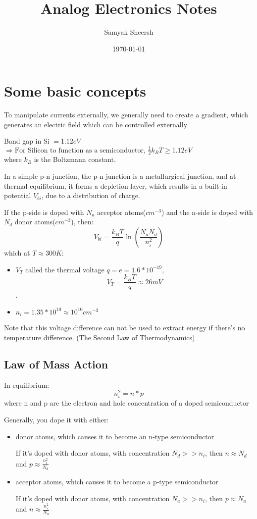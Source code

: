 \documentclass[12pt]{article}
\author{Samyak Sheersh}
\date{\today}
\title{Analog Electronics Notes}
\begin{document}
\maketitle
\tableofcontents

\section{Some basic concepts}
To manipulate currents externally, we generally need to create a gradient, which generates an electric field which can be controlled externally

Band gap in Si $=1.12 eV$\\
$\Rightarrow \text{For Silicon to function as a semiconductor, } \frac{1}{2}k_{B} T\geq 1.12 eV$\\

where $k_B$ is the Boltzmann constant.

In a simple p-n junction, the p-n junction is a metallurgical junction, and at thermal equilibrium, it forms a depletion layer, which results in a built-in potential $V_{bi}$, due to a distribution of charge. 

If the p-side is doped with $N_a$ acceptor atoms($cm^{-3}$) and the n-side is doped with $N_d$ donor atoms($cm^{-3}$), then:
\begin{equation}
    V_{bi}=\frac{k_B T}{q}\ln(\frac{N_a N_d}{n_{i}^{2}})
\end{equation}
which at $T\approx 300 K$:
\begin{itemize}
    \item $V_T$ called the thermal voltage $q=e=1.6*10^{-19}$, $$V_T=\frac{k_B T}{q}\approx 26mV$$. 
    \item $n_i=1.35*10^{10}\approx 10^{10} cm^{-3}$
\end{itemize}

Note that this voltage difference can not be used to extract energy if there's no temperature difference. (The Second Law of Thermodynamics)

\subsection{Law of Mass Action}
In equilibrium:
\begin{equation}
    n_i^2=n*p
\end{equation}
where n and p are the electron and hole concentration of a doped semiconductor

Generally, you dope it with either:
\begin{itemize}
    \item donor atoms, which causes it to become an n-type semiconductor

If it's doped with donor atoms, with concentration $N_d>>n_i$, then $n\approx N_d$ and $p\approx \frac{n_i^2}{N_d}$

    \item acceptor atoms, which causes it to become a p-type semiconductor

        If it's doped with donor atoms, with concentration $N_a>>n_i$, then $p\approx N_a$ and $n\approx \frac{n_i^2}{N_a}$
\end{itemize}
\end{document}
